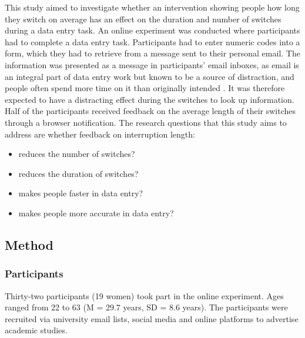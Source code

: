 This study aimed to investigate whether an intervention showing people how long they switch on average has an effect on the duration and number of switches during a data entry task. An online experiment was conducted where participants had to complete a data entry task. Participants had to enter numeric codes into a form, which they had to retrieve from a message sent to their personal email. The information was presented as a message in participants' email inboxes, as email is an integral part of data entry work but known to be a source of distraction, and people often spend more time on it than originally intended \citep{Hanrahan2015, Mark2016}. It was therefore expected to have a distracting effect during the switches to look up information. Half of the participants received feedback on the average length of their switches through a browser notification. 
The research questions that this study aims to address are whether feedback on interruption length:

\begin{itemize}
\item
reduces the number of switches?
\item
 reduces the duration of switches?
\item
makes people faster in data entry?
\item
makes people more accurate in data entry?
\end{itemize}

\subsection{Method}
\subsubsection{Participants}
Thirty-two participants (19 women) took part in the online experiment. Ages ranged from 22 to 63 (M = 29.7 years, SD = 8.6 years). The participants were recruited via university email lists, social media and online platforms to advertise academic studies. 

